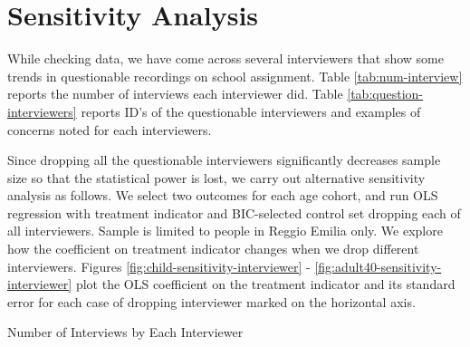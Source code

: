 


\doublespacing

\section{Sensitivity Analysis}

While checking data, we have come across several interviewers that show some trends in questionable recordings on school assignment. Table \ref{tab:num-interview} reports the number of interviews each interviewer did. Table \ref{tab:question-interviewers} reports ID's of the questionable interviewers and examples of concerns noted for each interviewers. 

Since dropping all the questionable interviewers significantly decreases sample size so that the statistical power is lost, we carry out alternative sensitivity analysis as follows. We select two outcomes for each age cohort, and run OLS regression with treatment indicator and BIC-selected control set dropping each of all interviewers. Sample is limited to people in Reggio Emilia only. We explore how the coefficient on treatment indicator changes when we drop different interviewers. Figures \ref{fig:child-sensitivity-interviewer} - \ref{fig:adult40-sensitivity-interviewer} plot the OLS coefficient on the treatment indicator and its standard error for each case of dropping interviewer marked on the horizontal axis.

\begin{table}[H] \caption{Number of Interviews by Each Interviewer} \label{tab:num-interview}
\scalebox{0.8}{}
\end{table}

